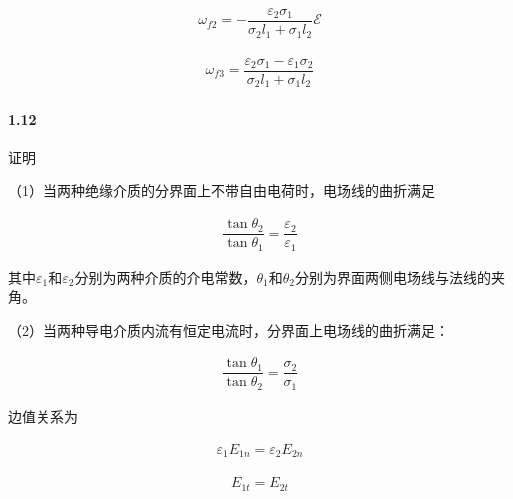 \documentclass{article}
\begin{document}
\begin{equation*}
  \begin{aligned}
    \omega_{f2} = - \dfrac{\varepsilon_2 \sigma_1}{\sigma_2 l_1 + \sigma_1 l_2} \mathcal{E}
  \end{aligned}
\end{equation*}

\begin{equation*}
  \begin{aligned}
    \omega_{f3} = \dfrac{\varepsilon_2 \sigma_1 - \varepsilon_1 \sigma_2}{\sigma_2 l_1 + \sigma_1 l_2} 
  \end{aligned}
\end{equation*}

\paragraph{1.12}

证明

（1）当两种绝缘介质的分界面上不带自由电荷时，电场线的曲折满足

\begin{equation*}
  \begin{aligned}
    \dfrac{\tan \theta_2}{\tan \theta_1} = \dfrac{\varepsilon_2}{\varepsilon_1}  
  \end{aligned}
\end{equation*}

其中$\varepsilon_1$和$\varepsilon_2$分别为两种介质的介电常数，$\theta_1$和$\theta_2$分别为界面两侧电场线与法线的夹角。

（2）当两种导电介质内流有恒定电流时，分界面上电场线的曲折满足：

\begin{equation*}
  \begin{aligned}
    \dfrac{\tan \theta_1}{\tan \theta_2} = \dfrac{\sigma_2}{\sigma_1}  
  \end{aligned}
\end{equation*}

边值关系为

\begin{equation*}
  \begin{aligned}
    \varepsilon_1 E_{1n} = \varepsilon_2 E_{2n}
  \end{aligned}
\end{equation*}

\begin{equation*}
  \begin{aligned}
    E_{1t} = E_{2t}
  \end{aligned}
\end{equation*}
\end{document}
